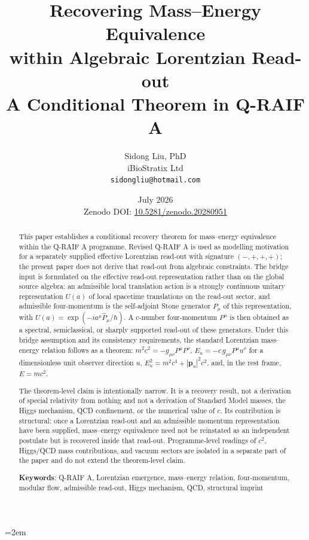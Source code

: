 \documentclass[12pt,a4paper]{article}
\title{%
  \textbf{Recovering Mass--Energy Equivalence}\\
  \textbf{within Algebraic Lorentzian Read-out}\\
  \large A Conditional Theorem in Q-RAIF A%
}
\author{
  Sidong Liu, PhD \\
  \small iBioStratix Ltd \\
  \small \texttt{sidongliu@hotmail.com}
}
\date{July 2026\\
\small Zenodo DOI: \href{https://doi.org/10.5281/zenodo.20280951}{10.5281/zenodo.20280951}}
\theoremstyle{definition}
\theoremstyle{remark}
\begin{document}
\emergencystretch=2em
\raggedbottom
{}

\maketitle

\begin{abstract}
This paper establishes a conditional recovery theorem for mass--energy equivalence within the Q-RAIF A programme. Revised Q-RAIF A is used as modelling motivation for a separately supplied effective Lorentzian read-out with signature $(-,+,+,+)$; the present paper does not derive that read-out from algebraic constraints. The bridge input is formulated on the effective read-out representation rather than on the global source algebra: an admissible local translation action is a strongly continuous unitary representation $U(a)$ of local spacetime translations on the read-out sector, and admissible four-momentum is the self-adjoint Stone generator $\hat P_\mu$ of this representation, with $U(a)=\exp(-i a^\mu\hat P_\mu/\hbar)$. A c-number four-momentum $P^\mu$ is then obtained as a spectral, semiclassical, or sharply supported read-out of these generators. Under this bridge assumption and its consistency requirements, the standard Lorentzian mass--energy relation follows as a theorem: $m^2c^2=-g_{\mu\nu}P^\mu P^\nu$, $E_u=-c\,g_{\mu\nu}P^\mu u^\nu$ for a dimensionless unit observer direction $u$, $E_u^2=m^2c^4+|\mathbf p_u|^2c^2$, and, in the rest frame, $E=mc^2$.

The theorem-level claim is intentionally narrow. It is a recovery result, not a derivation of special relativity from nothing and not a derivation of Standard Model masses, the Higgs mechanism, QCD confinement, or the numerical value of $c$. Its contribution is structural: once a Lorentzian read-out and an admissible momentum representation have been supplied, mass--energy equivalence need not be reinstated as an independent postulate but is recovered inside that read-out. Programme-level readings of $c^2$, Higgs/QCD mass contributions, and vacuum sectors are isolated in a separate part of the paper and do not extend the theorem-level claim.

\medskip
\noindent\textbf{Keywords}: Q-RAIF A, Lorentzian emergence, mass--energy relation, four-momentum, modular flow, admissible read-out, Higgs mechanism, QCD, structural imprint
\end{abstract}

\clearpage
\tableofcontents
\clearpage
\end{document}
